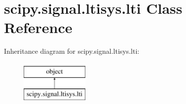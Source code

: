 \hypertarget{classscipy_1_1signal_1_1ltisys_1_1lti}{}\section{scipy.\+signal.\+ltisys.\+lti Class Reference}
\label{classscipy_1_1signal_1_1ltisys_1_1lti}
Inheritance diagram for scipy.\+signal.\+ltisys.\+lti\+:\begin{figure}[H]
\begin{center}
\leavevmode
\includegraphics[height=2.000000cm]{classscipy_1_1signal_1_1ltisys_1_1lti}
\end{center}
\end{figure}
